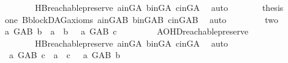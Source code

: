 \begin{isabellebody}
\ \ \ \ \ \ \ \ HB{}{\isachardot}{\kern0pt}reachable{}{\isacharunderscore}{\kern0pt}preserve\ a{\isacharunderscore}{\kern0pt}in{\isacharunderscore}{\kern0pt}G{\isacharunderscore}{\kern0pt}A\ b{\isacharunderscore}{\kern0pt}in{\isacharunderscore}{\kern0pt}G{\isacharunderscore}{\kern0pt}A\ c{\isacharunderscore}{\kern0pt}in{\isacharunderscore}{\kern0pt}G{\isacharunderscore}{\kern0pt}A\ \isamarkupfalse%
\ auto\isanewline
\ \ \ \ \isamarkupfalse%
\ \isamarkupfalse%
\ {\isacharquery}{\kern0pt}thesis\ \isamarkupfalse%
\ one\ B{}{\isachardot}{\kern0pt}blockDAG{\isacharunderscore}{\kern0pt}axioms\ a{\isacharunderscore}{\kern0pt}in{\isacharunderscore}{\kern0pt}G{\isacharunderscore}{\kern0pt}AB\ b{\isacharunderscore}{\kern0pt}in{\isacharunderscore}{\kern0pt}G{\isacharunderscore}{\kern0pt}AB\ c{\isacharunderscore}{\kern0pt}in{\isacharunderscore}{\kern0pt}G{\isacharunderscore}{\kern0pt}AB\ \isamarkupfalse%
\ auto\isanewline
\ \ \isamarkupfalse%
\isanewline
\ \ \ \ \isamarkupfalse%
\ two\isanewline
\ \ \ \ \isamarkupfalse%
\ \isamarkupfalse%
\ {\isachardoublequoteopen}{\isasymnot}{\isacharparenleft}{\kern0pt}{\isacharparenleft}{\kern0pt}a\ {\isasymrightarrow}\isactrlsup {\isacharplus}{\kern0pt}\isactrlbsub G{\isacharunderscore}{\kern0pt}AB\isactrlesub \ b\ {\isasymor}\ a\ {\isacharequal}{\kern0pt}\ b{\isacharparenright}{\kern0pt}\ {\isasymand}\ {\isacharparenleft}{\kern0pt}{\isasymnot}\ a\ {\isasymrightarrow}\isactrlsup {\isacharplus}{\kern0pt}\isactrlbsub G{\isacharunderscore}{\kern0pt}AB\isactrlesub \ c{\isacharparenright}{\kern0pt}{\isacharparenright}{\kern0pt}{\isachardoublequoteclose}\ \isanewline
\ \ \ \ \ \ \isamarkupfalse%
\ AOHD{\isachardot}{\kern0pt}reachable{}{\isacharunderscore}{\kern0pt}preserve\isanewline
\ \ \ \ \ \ \ \ HB{}{\isachardot}{\kern0pt}reachable{}{\isacharunderscore}{\kern0pt}preserve\ a{\isacharunderscore}{\kern0pt}in{\isacharunderscore}{\kern0pt}G{\isacharunderscore}{\kern0pt}A\ b{\isacharunderscore}{\kern0pt}in{\isacharunderscore}{\kern0pt}G{\isacharunderscore}{\kern0pt}A\ c{\isacharunderscore}{\kern0pt}in{\isacharunderscore}{\kern0pt}G{\isacharunderscore}{\kern0pt}A\ \isamarkupfalse%
\ auto\isanewline
\ \ \ \ \isamarkupfalse%
\ \isamarkupfalse%
\ {\isachardoublequoteopen}\ {\isacharparenleft}{\kern0pt}a\ {\isasymrightarrow}\isactrlsup {\isacharplus}{\kern0pt}\isactrlbsub G{\isacharunderscore}{\kern0pt}AB\isactrlesub \ c\ {\isasymor}\ a\ {\isacharequal}{\kern0pt}\ c{\isacharparenright}{\kern0pt}\ {\isasymand}\ {\isacharparenleft}{\kern0pt}{\isasymnot}\ a\ {\isasymrightarrow}\isactrlsup {\isacharplus}{\kern0pt}\isactrlbsub G{\isacharunderscore}{\kern0pt}AB\isactrlesub \ b{\isacharparenright}{\kern0pt}{\isachardoublequoteclose}\ \isanewline

\end{isabellebody}
